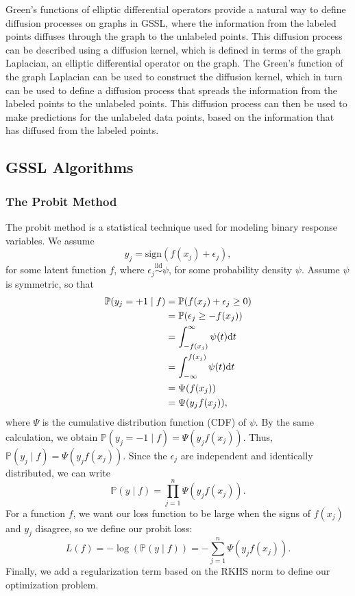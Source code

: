 \documentclass[12pt]{amsart}
\newcommand{\iid}{\overset{\mathrm{iid}}{\sim}}
\begin{document}
Green's functions of elliptic differential operators provide a natural way to define diffusion processes on graphs in GSSL, where the information from the labeled points diffuses through the graph to the unlabeled points. This diffusion process can be described using a diffusion kernel, which is defined in terms of the graph Laplacian, an elliptic differential operator on the graph. The Green's function of the graph Laplacian can be used to construct the diffusion kernel, which in turn can be used to define a diffusion process that spreads the information from the labeled points to the unlabeled points. This diffusion process can then be used to make predictions for the unlabeled data points, based on the information that has diffused from the labeled points.

\subsection{GSSL Algorithms}
\subsubsection{The Probit Method}
The probit method is a statistical technique used for modeling binary response variables. We assume
\[y_j = \mathrm{sign}(f(x_j) + \epsilon_j),\]
for some latent function $f$, where $\epsilon_j\iid \psi$, for some probability density $\psi$. Assume $\psi$ is symmetric, so that
\begin{align*}
	\mathbb{P}(y_j = +1 \mid f) &= \mathbb{P}(f(x_j) + \epsilon_j \geq 0) \\
	&= \mathbb{P}(\epsilon_j \geq - f(x_j)  ) \\
	&= \int_{-f(x_j)}^\infty \psi(t) {\mathrm{d}} t \\
	&= \int_{-\infty}^{f(x_j)} \psi(t) {\mathrm{d}} t \\
	&= \Psi(f(x_j)) \\
	&= \Psi(y_jf(x_j)),
\end{align*}
where $\Psi$ is the cumulative distribution function (CDF) of $\psi$. By the same calculation, we obtain $\mathbb{P}(y_j = -1 \mid f) = \Psi(y_jf(x_j))$. Thus, $\mathbb{P}(y_j \mid f) = \Psi(y_jf(x_j))$. Since the $\epsilon_j$ are independent and identically distributed, we can write
\[\mathbb{P}(y  \mid f) = \prod_{j = 1}^n \Psi(y_jf(x_j)).\]
For a function $f$, we want our loss function to be large when the signs of $f(x_j)$ and $y_j$  disagree, so we define our probit loss:
\[L(f) = -\log(\mathbb{P}(y\mid f)) = -\sum_{j = 1}^n \Psi(y_jf(x_j)).\]
Finally, we add a regularization term based on the RKHS norm to define our optimization problem.
\end{document}
